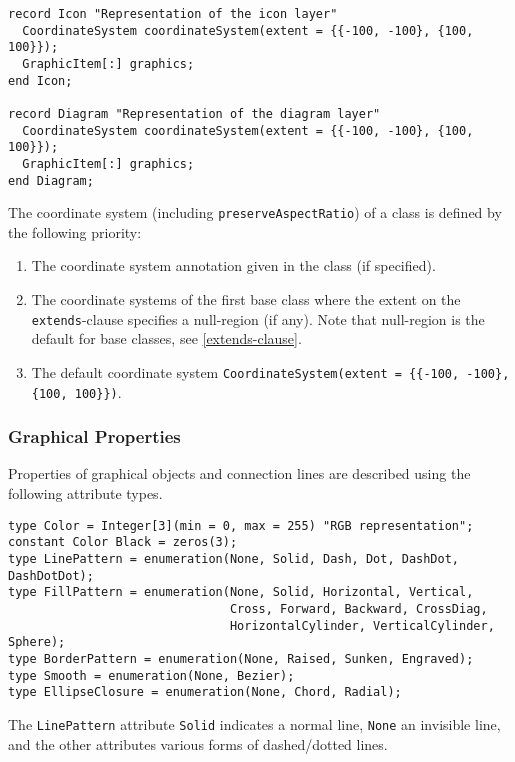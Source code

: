 \begin{lstlisting}[language=modelica]
record Icon "Representation of the icon layer"
  CoordinateSystem coordinateSystem(extent = {{-100, -100}, {100, 100}});
  GraphicItem[:] graphics;
end Icon;

record Diagram "Representation of the diagram layer"
  CoordinateSystem coordinateSystem(extent = {{-100, -100}, {100, 100}});
  GraphicItem[:] graphics;
end Diagram;
\end{lstlisting}
The coordinate system (including \lstinline!preserveAspectRatio!) of a class is defined by the following priority:
\begin{enumerate}
\item
  The coordinate system annotation given in the class (if specified).
\item
  The coordinate systems of the first base class where the extent on the \lstinline!extends!-clause specifies a null-region (if any).
  Note that null-region is the default for base classes, see \cref{extends-clause}.
\item
  The default coordinate system \lstinline!CoordinateSystem(extent = {{-100, -100}, {100, 100}})!.
\end{enumerate}

\subsubsection{Graphical Properties}\label{graphical-properties}

Properties of graphical objects and connection lines are described using the following attribute types.
\begin{lstlisting}[language=modelica]
type Color = Integer[3](min = 0, max = 255) "RGB representation";
constant Color Black = zeros(3);
type LinePattern = enumeration(None, Solid, Dash, Dot, DashDot, DashDotDot);
type FillPattern = enumeration(None, Solid, Horizontal, Vertical,
                               Cross, Forward, Backward, CrossDiag,
                               HorizontalCylinder, VerticalCylinder, Sphere);
type BorderPattern = enumeration(None, Raised, Sunken, Engraved);
type Smooth = enumeration(None, Bezier);
type EllipseClosure = enumeration(None, Chord, Radial);
\end{lstlisting}%
The \lstinline!LinePattern! attribute \lstinline!Solid! indicates a normal line, \lstinline!None! an invisible line, and the other attributes various forms of dashed/dotted lines.

